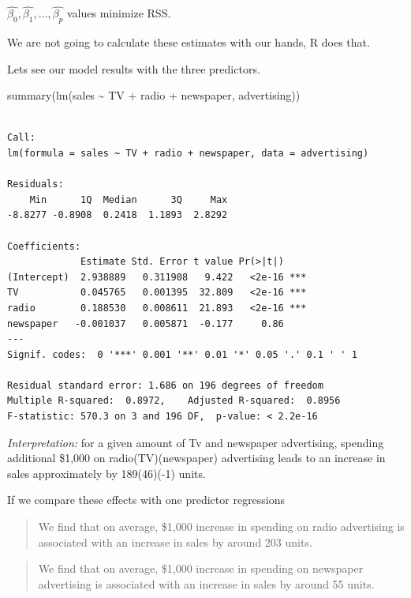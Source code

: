 \documentclass[
  letterpaper,
  DIV=11,
  numbers=noendperiod]{scrreprt}
\newenvironment{Shaded}{\begin{snugshade}}{\end{snugshade}}
\newcommand{\FunctionTok}[1]{\textcolor[rgb]{0.02,0.16,0.49}{#1}}
\newcommand{\NormalTok}[1]{\textcolor[rgb]{0.33,0.33,0.33}{#1}}
\newcommand{\SpecialCharTok}[1]{\textcolor[rgb]{0.00,0.46,0.62}{#1}}
\begin{document}
\(\hat{\beta_0}, \hat{\beta_1},\dots, \hat{\beta_p}\) values minimize
RSS.

We are not going to calculate these estimates with our hands, R does
that.

Lets see our model results with the three predictors.

\begin{Shaded}
\begin{Highlighting}[]
\FunctionTok{summary}\NormalTok{(}\FunctionTok{lm}\NormalTok{(sales }\SpecialCharTok{\textasciitilde{}}\NormalTok{ TV }\SpecialCharTok{+}\NormalTok{ radio }\SpecialCharTok{+}\NormalTok{ newspaper, advertising))}
\end{Highlighting}
\end{Shaded}

\begin{verbatim}

Call:
lm(formula = sales ~ TV + radio + newspaper, data = advertising)

Residuals:
    Min      1Q  Median      3Q     Max 
-8.8277 -0.8908  0.2418  1.1893  2.8292 

Coefficients:
             Estimate Std. Error t value Pr(>|t|)    
(Intercept)  2.938889   0.311908   9.422   <2e-16 ***
TV           0.045765   0.001395  32.809   <2e-16 ***
radio        0.188530   0.008611  21.893   <2e-16 ***
newspaper   -0.001037   0.005871  -0.177     0.86    
---
Signif. codes:  0 '***' 0.001 '**' 0.01 '*' 0.05 '.' 0.1 ' ' 1

Residual standard error: 1.686 on 196 degrees of freedom
Multiple R-squared:  0.8972,    Adjusted R-squared:  0.8956 
F-statistic: 570.3 on 3 and 196 DF,  p-value: < 2.2e-16
\end{verbatim}

\emph{Interpretation:} for a given amount of Tv and newspaper
advertising, spending additional \$1,000 on radio(TV)(newspaper)
advertising leads to an increase in sales approximately by 189(46)(-1)
units.

If we compare these effects with one predictor regressions

\begin{quote}
We find that on average, \$1,000 increase in spending on radio
advertising is associated with an increase in sales by around 203 units.
\end{quote}

\begin{quote}
We find that on average, \$1,000 increase in spending on newspaper
advertising is associated with an increase in sales by around 55 units.
\end{quote}
\end{document}
